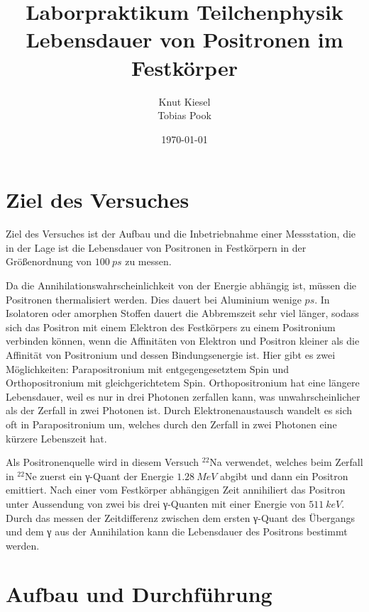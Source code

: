 \documentclass[a4paper,12pt]{article}
\title{Laborpraktikum Teilchenphysik\\ Lebensdauer von Positronen im Festkörper}
\author{Knut Kiesel\\Tobias Pook}
\date{\today}
\begin{document}
\maketitle
\vspace{3cm}
\tableofcontents
\thispagestyle{empty}
\newpage
\setcounter{page}{1}

\section{Ziel des Versuches}
Ziel des Versuches ist der Aufbau und die Inbetriebnahme einer Messstation,
die in der Lage ist die Lebensdauer von Positronen in Festkörpern in der
Größenordnung von $\SI{100}{ps}$ zu messen.

Da die Annihilationswahrscheinlichkeit von der Energie abhängig ist,
müssen die Positronen thermalisiert werden.
Dies dauert bei Aluminium wenige $\si{ps}$.
In Isolatoren oder amorphen Stoffen dauert die Abbremszeit sehr viel länger,
sodass sich das Positron mit einem Elektron des Festkörpers zu einem Positronium verbinden können,
wenn die Affinitäten von Elektron und Positron kleiner
als die Affinität von Positronium und dessen Bindungsenergie ist.
Hier gibt es zwei Möglichkeiten: Parapositronium mit entgegengesetztem Spin und Orthopositronium mit gleichgerichtetem Spin.
Orthopositronium hat eine längere Lebensdauer, weil es nur in drei Photonen zerfallen kann, was unwahrscheinlicher als der Zerfall in zwei Photonen ist.
Durch Elektronenaustausch wandelt es sich oft in Parapositronium um, welches durch den Zerfall in zwei Photonen eine kürzere Lebenszeit hat.

Als Positronenquelle wird in diesem Versuch $^{22}$Na verwendet, welches beim Zerfall in $^{22}$Ne
zuerst ein γ-Quant der Energie $\SI{1.28}{MeV}$ abgibt und dann ein Positron emittiert.
Nach einer vom Festkörper abhängigen Zeit annihiliert das Positron unter Aussendung
von zwei bis drei γ-Quanten mit einer Energie von $\SI{511}{keV}$.
Durch das messen der Zeitdifferenz zwischen dem ersten γ-Quant des Übergangs und dem
γ aus der Annihilation kann die Lebensdauer des Positrons bestimmt werden.


\section{Aufbau und Durchführung}
\end{document}
